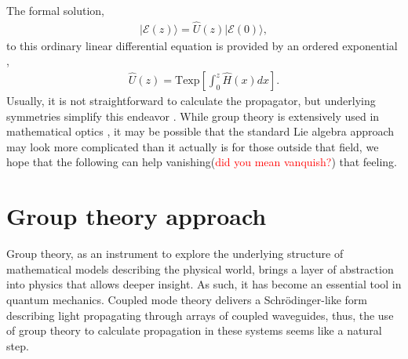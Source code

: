 \documentclass[9pt,twocolumn,twoside]{osajnl}
\begin{document}
The formal solution,
\begin{eqnarray}
\vert \mathcal{E}(z) \rangle = \hat{U}(z) \vert \mathcal{E}(0) \rangle,
\end{eqnarray}
to this ordinary linear differential equation is provided by an ordered exponential \cite{Magnus1954p649,Blanes2009p151}, 
\begin{eqnarray} 
\hat{U}(z) = \mathrm{Texp} \left[ \int_{0}^{z} \hat{H}(x) dx \right].
\end{eqnarray}
Usually, it is not straightforward to calculate the propagator,
but underlying symmetries simplify this endeavor \cite{Lie1880p441,Neumaier2008}.
While group theory is extensively used in mathematical optics \cite{Wolf2004,Lakshminarayanan2012}, it may be possible that the standard Lie algebra approach may look more complicated than it actually is for those outside that field, we hope that the following can help vanishing(\textcolor{red}{did you mean vanquish?}) that feeling.


\section{Group theory approach}

Group theory, as an instrument to explore the underlying structure of mathematical models describing the physical world, brings a layer of abstraction into physics that allows deeper insight.
As such, it has become an essential tool in quantum mechanics.
Coupled mode theory delivers a Schr\"odinger-like form describing light propagating through arrays of coupled waveguides, thus, the use of group theory to calculate propagation in these systems seems like a natural step.
\end{document}
